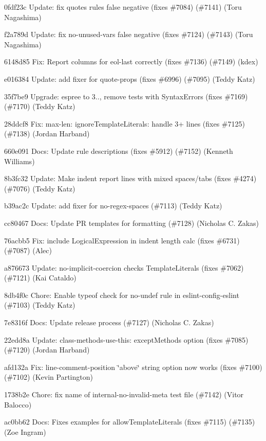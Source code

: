 \begin{DoxyItemize}
\item 0fdf23c Update\+: fix {\ttfamily quotes} rule\textquotesingle{}s false negative (fixes \#7084) (\#7141) (Toru Nagashima)
\item f2a789d Update\+: fix {\ttfamily no-\/unused-\/vars} false negative (fixes \#7124) (\#7143) (Toru Nagashima)
\item 6148d85 Fix\+: Report columns for {\ttfamily eol-\/last} correctly (fixes \#7136) (\#7149) (kdex)
\item e016384 Update\+: add fixer for quote-\/props (fixes \#6996) (\#7095) (Teddy Katz)
\item 35f7be9 Upgrade\+: espree to 3.., remove tests with Syntax\+Errors (fixes \#7169) (\#7170) (Teddy Katz)
\item 28ddcf8 Fix\+: {\ttfamily max-\/len}\+: {\ttfamily ignore\+Template\+Literals}\+: handle 3+ lines (fixes \#7125) (\#7138) (Jordan Harband)
\item 660e091 Docs\+: Update rule descriptions (fixes \#5912) (\#7152) (Kenneth Williams)
\item 8b3fc32 Update\+: Make {\ttfamily indent} report lines with mixed spaces/tabs (fixes \#4274) (\#7076) (Teddy Katz)
\item b39ac2c Update\+: add fixer for {\ttfamily no-\/regex-\/spaces} (\#7113) (Teddy Katz)
\item cc80467 Docs\+: Update PR templates for formatting (\#7128) (Nicholas C. Zakas)
\item 76acbb5 Fix\+: include Logical\+Expression in indent length calc (fixes \#6731) (\#7087) (Alec)
\item a876673 Update\+: no-\/implicit-\/coercion checks Template\+Literals (fixes \#7062) (\#7121) (Kai Cataldo)
\item 8db4f0c Chore\+: Enable {\ttfamily typeof} check for {\ttfamily no-\/undef} rule in eslint-\/config-\/eslint (\#7103) (Teddy Katz)
\item 7e8316f Docs\+: Update release process (\#7127) (Nicholas C. Zakas)
\item 22edd8a Update\+: {\ttfamily class-\/methods-\/use-\/this}\+: {\ttfamily except\+Methods} option (fixes \#7085) (\#7120) (Jordan Harband)
\item afd132a Fix\+: line-\/comment-\/position \char`\"{}above\char`\"{} string option now works (fixes \#7100) (\#7102) (Kevin Partington)
\item 1738b2e Chore\+: fix name of internal-\/no-\/invalid-\/meta test file (\#7142) (Vitor Balocco)
\item ac0bb62 Docs\+: Fixes examples for allow\+Template\+Literals (fixes \#7115) (\#7135) (Zoe Ingram)

\end{DoxyItemize}
